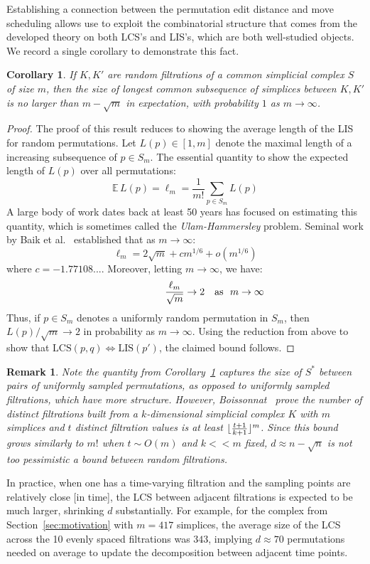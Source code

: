 \documentclass[sn-mathphys]{sn-jnl}
\newtheorem{corollary}{Corollary}
\newtheorem{remark}{Remark}
\DeclarePairedDelimiter\floor{\lfloor}{\rfloor}
\begin{document}
\noindent
Establishing a connection between the permutation edit distance and move scheduling allows use to exploit the combinatorial structure that comes from the developed theory on both LCS's and LIS's, which are both well-studied objects. We record a single corollary to demonstrate this fact. 
\begin{corollary}\label{cor:expectation}
If $K, K'$ are random filtrations of a common simplicial complex $S$ of size $m$, then the size of longest common subsequence of simplices between $K,K'$ is no larger than $m - \sqrt{m}$ in expectation, with probability $1$ as $m \to \infty$.
\end{corollary}
\begin{proof} \normalsize
	The proof of this result reduces to showing the average length of the LIS for random permutations. Let $L(p) \in [1,m]$ denote the maximal length of a increasing subsequence of $p \in S_m$. 
	The essential quantity to show the expected length of $L(p)$ over all permutations: 
	$$ \mathbb{E} \, L(p) = \ell_m = \frac{1}{m!} \sum\limits_{p \in S_m} L(p)$$
	A large body of work dates back at least 50 years has focused on estimating this quantity, which is sometimes called the \emph{Ulam-Hammersley} problem. Seminal work by Baik et al.~\cite{baik1999distribution} established that as $m \to \infty$:
	$$ \displaystyle \ell_m = 2 \sqrt{m} + c m^{1/6} + o(m^{1/6}) $$
where $c = -1.77108...$. Moreover, letting $m \to \infty$, we have: 
$$ \frac{\ell_m}{\sqrt{m}} \to 2\rlap{\quad \text{as } $m \to \infty$} $$	 
Thus, if $p \in S_m$ denotes a uniformly random permutation in $S_m$, then $L(p)/\sqrt{m} \to 2$ in probability as $m \to \infty$. Using the reduction from above to show that $\mathrm{LCS}(p,q) \Leftrightarrow \mathrm{LIS}(p')$, the claimed bound follows.
\end{proof}
\begin{remark}
\noindent Note the quantity from Corollary~\ref{cor:expectation} captures the size of $S^\ast$ between pairs of uniformly sampled permutations, as opposed to uniformly sampled filtrations, which have more structure. 
However, Boissonnat~\cite{boissonnat2018efficient} prove the number of distinct filtrations built from a $k$-dimensional simplicial complex $K$ with $m$ simplices and $t$ distinct filtration values is \emph{at least} $\floor{\frac{t+1}{k+1}}^m$. 
Since this bound grows similarly to $m!$ when $t \sim O(m)$ and $k << m$ fixed, $d \approx n - \sqrt{n}$ is not too pessimistic a bound between random filtrations.     
\end{remark}
\noindent 
In practice, when one has a time-varying filtration and the sampling points are relatively close [in time], the LCS between adjacent filtrations is expected to be much larger, shrinking $d$ substantially. 
For example, for the complex from Section~\ref{sec:motivation} with $m=417$ simplices, the average size of the LCS across the 10 evenly spaced filtrations was $343$, implying $d \approx 70$ permutations needed on average to update the decomposition between adjacent time points.
 
\end{document}
